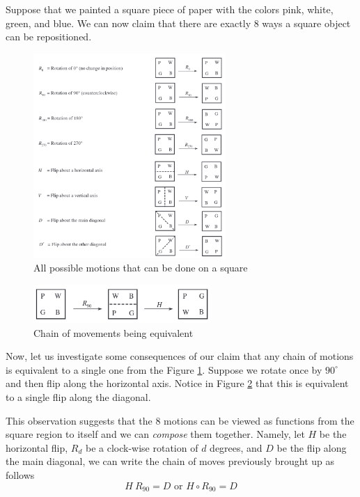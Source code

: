 Suppose that we painted a square piece of paper with the colors pink, white, green, and blue. We can now claim that there are exactly 8 ways a square object can be repositioned.

\begin{figure}[ht]
    \centering
    \includegraphics[width=0.65\textwidth]{images/ch1-movements-of-square.png}
    \caption{All possible motions that can be done on a square}
    \label{fig:sqmovements}
\end{figure}

\begin{figure}[ht]
    \centering
    \includegraphics[width=0.6\textwidth]{images/ch1-chain-of-movements.png}
    \caption{Chain of movements being equivalent}
    \label{fig:chainmoves}
\end{figure}

Now, let us investigate some consequences of our claim that any chain of motions is equivalent to a single one from the Figure \ref{fig:sqmovements}. Suppose we rotate once by \(90^\circ\) and then flip along the horizontal axis. Notice in Figure \ref{fig:chainmoves} that this is equivalent to a single flip along the diagonal.

This observation suggests that the 8 motions can be viewed as functions from the square region to itself and we can \textit{compose} them together. Namely, let \(H\) be the horizontal flip, \(R_{d}\) be a clock-wise rotation of \(d\) degrees, and \(D\) be the flip along the main diagonal, we can write the chain of moves previously brought up as follows
\[
    H\ R_{90} = D \text{ or } H \circ R_{90} = D
\]

